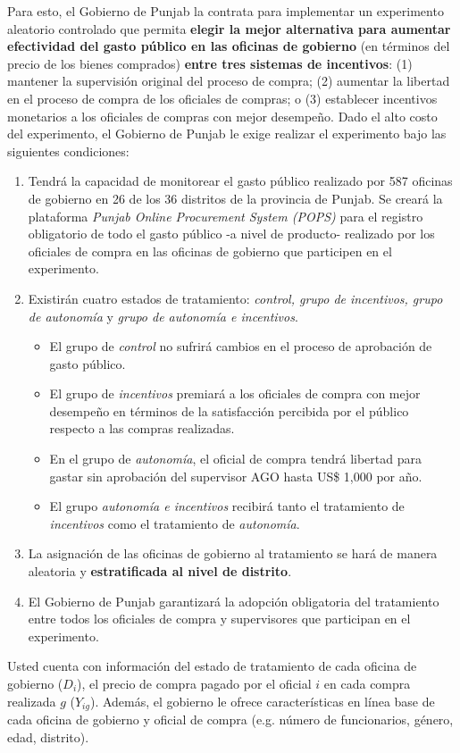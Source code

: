 \documentclass[a4paper, answers, addpoints, 11pt]{exam}
\begin{document}
\bigbreak
Para esto, el Gobierno de Punjab la contrata para implementar un experimento aleatorio controlado que permita \textbf{elegir la mejor alternativa para aumentar efectividad del gasto público en las oficinas de gobierno} (en términos del precio de los bienes comprados) \textbf{entre tres sistemas de incentivos}: (1) mantener la supervisión original del proceso de compra; (2) aumentar la libertad en el proceso de compra de los oficiales de compras; o (3) establecer incentivos monetarios a los oficiales de compras con mejor desempeño. Dado el alto costo del experimento, el Gobierno de Punjab le exige realizar el experimento bajo las siguientes condiciones:
\begin{enumerate}
\begin{enumerate}
    \item Tendrá la capacidad de monitorear el gasto público realizado por 587 oficinas de gobierno en 26 de los 36 distritos de la provincia de Punjab. Se creará la plataforma \textit{Punjab Online Procurement System (POPS)} para el registro obligatorio de todo el gasto público -a nivel de producto- realizado por los oficiales de compra en las oficinas de gobierno que participen en el experimento. %
    \item Existirán cuatro estados de tratamiento: \textit{control, grupo de incentivos, grupo de autonomía} y \textit{grupo de autonomía e incentivos}. 
    \begin{itemize}
        \item El grupo de \textit{control} no sufrirá cambios en el proceso de aprobación de gasto público.
        \item El grupo de \textit{incentivos} premiará a los oficiales de compra con mejor desempeño en términos de la satisfacción percibida por el público respecto a las compras realizadas.
        \item En el grupo de \textit{autonomía}, el oficial de compra tendrá libertad para gastar sin aprobación del supervisor AGO hasta US\$ 1,000 por año.
        \item El grupo \textit{autonomía e incentivos} recibirá tanto el tratamiento de \textit{incentivos} como el tratamiento de \textit{autonomía}.
    \end{itemize}
      
    \item La asignación de las oficinas de gobierno al tratamiento se hará de manera aleatoria y \textbf{estratificada al nivel de distrito}.
    \item El Gobierno de Punjab garantizará la adopción obligatoria del tratamiento entre todos los oficiales de compra y supervisores que participan en el experimento.
\end{enumerate}
Usted cuenta con información del estado de tratamiento de cada oficina de gobierno ($D_i$), el precio de compra pagado por el oficial $i$ en cada compra realizada  $g$ ($Y_{ig}$). Además, el gobierno le ofrece características en línea base de cada oficina de gobierno y oficial de compra (e.g. número de funcionarios, género, edad, distrito).


\end{enumerate}
\end{document}
